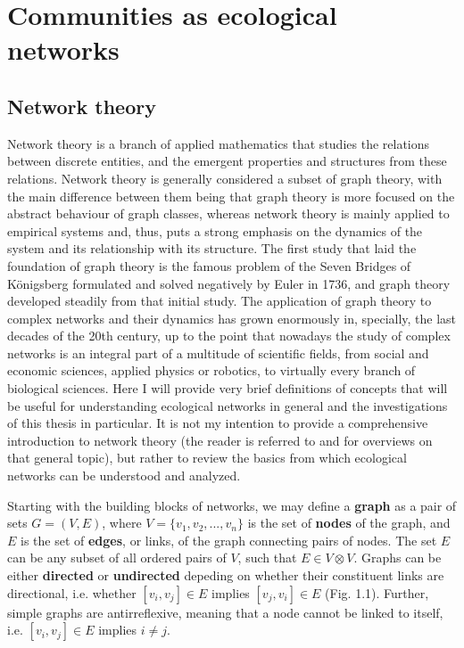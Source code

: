 \section{Communities as ecological networks}
\subsection{Network theory}

Network theory is a branch of applied mathematics that studies the relations between discrete entities, and the emergent properties and structures from these relations. Network theory is generally considered a subset of graph theory, with the main difference between them being that graph theory is more focused on the abstract behaviour of graph classes, whereas network theory is mainly applied to empirical systems and, thus, puts a strong emphasis on the dynamics of the system and its relationship with its structure. The first study that laid the foundation of graph theory is the famous problem of the Seven Bridges of Königsberg formulated and solved negatively by Euler in 1736, and graph theory developed steadily from that initial study. The application of graph theory to complex networks and their dynamics has grown enormously in, specially, the last decades of the 20th century, up to the point that nowadays the study of complex networks is an integral part of a multitude of scientific fields, from social and economic sciences, applied physics or robotics, to virtually every branch of biological sciences. Here I will provide very brief definitions of concepts that will be useful for understanding ecological networks in general and the investigations of this thesis in particular. It is not my intention to provide a comprehensive introduction to network theory (the reader is referred to \cite{Newman2010} and \cite{Barabasi2016} for overviews on that general topic), but rather to review the basics from which ecological networks can be understood and analyzed.


Starting with the building blocks of networks, we may define a \textbf{graph} as a pair of sets $G = (V,E)$, where $V = \{v_1,v_2,...,v_n\}$ is the set of \textbf{nodes} of the graph, and $E$ is the set of \textbf{edges}, or links, of the graph connecting pairs of nodes. The set $E$ can be any subset of all ordered pairs of $V$, such that $E \in V \otimes V$. Graphs can be either \textbf{directed} or \textbf{undirected} depeding on whether their constituent links are directional, i.e. whether $[v_i,v_j] \in E$ implies $[v_j,v_i] \in E$ (Fig. 1.1). Further, simple graphs are antirreflexive, meaning that a node cannot be linked to itself, i.e. $[v_i,v_j] \in E$ implies $i \neq j$.

